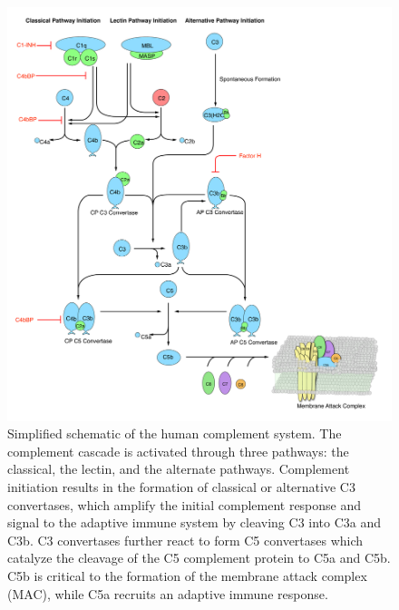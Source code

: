 \documentclass[12pt]{article}
\begin{document}
\begin{figure}[h]
\centering
\includegraphics[width=1.0\textwidth]{./figs/Fig1_Schematic_v2.pdf}
\caption{Simplified schematic of the human complement system. The complement cascade is activated through three pathways:  the classical, the lectin, and the alternate pathways.
Complement initiation results in the formation of classical or alternative C3 convertases, which amplify the initial complement response and signal to the adaptive immune system by cleaving C3 into C3a and C3b. C3 convertases further react to form C5 convertases which catalyze the cleavage of the C5 complement protein to C5a and C5b.
C5b is critical to the formation of the membrane attack complex (MAC), while C5a recruits an adaptive immune response.}\label{fig-schematic}
\end{figure}
\end{document}
